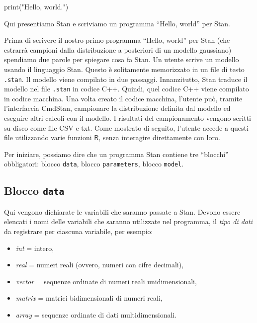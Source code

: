 \documentclass[
  10pt,
  italian,
  a4paper,
  extrafontsizes,onecolumn,openright
  ]{memoir}
\newenvironment{Shaded}{\begin{snugshade}}{\end{snugshade}}
\newcommand{\BuiltInTok}[1]{#1}
\newcommand{\NormalTok}[1]{#1}
\newcommand{\StringTok}[1]{\textcolor[rgb]{0.31,0.60,0.02}{#1}}
\providecommand{\tightlist}{%
  \setlength{\itemsep}{0pt}\setlength{\parskip}{0pt}}
\newlength{\rf}
\newcommand{\R}{\textsf{R}} %
\begin{document}
\begin{Shaded}
\begin{Highlighting}[]
\BuiltInTok{print}\NormalTok{(}\StringTok{"Hello, world."}\NormalTok{)}
\end{Highlighting}
\end{Shaded}

Qui presentiamo Stan e scriviamo un programma ``Hello, world'' per Stan.

Prima di scrivere il nostro primo programma ``Hello, world'' per Stan (che estrarrà campioni dalla distribuzione a posteriori di un modello gaussiano) spendiamo due parole per spiegare cosa fa Stan. Un utente scrive un modello usando il linguaggio Stan. Questo è solitamente memorizzato in un file di testo \texttt{.stan}. Il modello viene compilato in due passaggi. Innanzitutto, Stan traduce il modello nel file \texttt{.stan} in codice C++. Quindi, quel codice C++ viene compilato in codice macchina. Una volta creato il codice macchina, l'utente può, tramite l'interfaccia CmdStan, campionare la distribuzione definita dal modello ed eseguire altri calcoli con il modello. I risultati del campionamento vengono scritti su disco come file CSV e txt. Come mostrato di seguito, l'utente accede a questi file utilizzando varie funzioni \(\R\), senza interagire direttamente con loro.

Per iniziare, possiamo dire che un programma Stan contiene tre ``blocchi'' obbligatori: blocco \texttt{data}, blocco \texttt{parameters}, blocco \texttt{model}.

\hypertarget{blocco-data}{%
\subsection{\texorpdfstring{Blocco \texttt{data}}{Blocco data}}\label{blocco-data}}

Qui vengono dichiarate le variabili che saranno passate a Stan. Devono essere elencati i nomi delle variabili che saranno utilizzate nel programma, il \emph{tipo di dati} da registrare per ciascuna variabile, per esempio:

\begin{itemize}
\tightlist
\item
  \emph{int} = intero,
\item
  \emph{real} = numeri reali (ovvero, numeri con cifre decimali),
\item
  \emph{vector} = sequenze ordinate di numeri reali unidimensionali,
\item
  \emph{matrix} = matrici bidimensionali di numeri reali,
\item
  \emph{array} = sequenze ordinate di dati multidimensionali.
\end{itemize}
\end{document}

